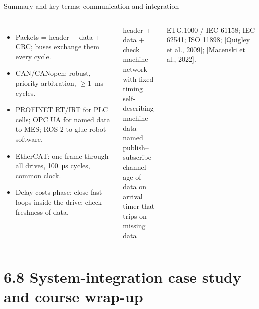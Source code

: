 \documentclass[aspectratio=169,10pt]{beamer}
\begin{document}
\begin{frame}{Summary and key terms: communication and integration}
\begin{columns}[T]
\begin{itemize}\small
\item Packets = header + data + CRC; buses exchange them every cycle.
\item CAN/CANopen: robust, priority arbitration, $\ge$\SI{1}{ms} cycles.
\item PROFINET RT/IRT for PLC cells; OPC UA for named data to MES; ROS 2 to glue robot software.
\item EtherCAT: one frame through all drives, \SI{100}{\micro s} cycles, common clock.
\item Delay costs phase: close fast loops inside the drive; check freshness of data.
\end{itemize}
\begin{defbox}
\small
{} header + data + check\\
 machine network with fixed timing\\
 self-describing machine data\\
 named publish--subscribe channel\\
 age of data on arrival\\
 timer that trips on missing data
\end{defbox}
{\scriptsize\color{mkGray} ETG.1000 / IEC 61158; IEC 62541; ISO 11898; [Quigley et al., 2009]; [Macenski et al., 2022].}
\end{columns}
\end{frame}


\section{6.8 System-integration case study and course wrap-up}
\end{document}
